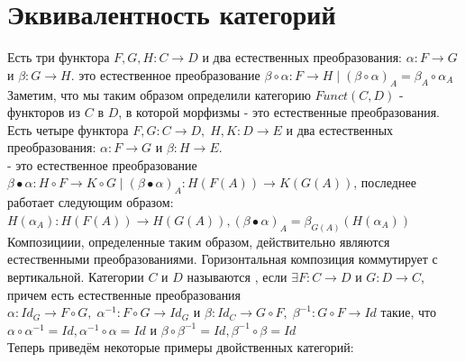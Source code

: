 \documentclass[a4paper]{article}
\theoremstyle{indented}
\theoremstyle{definition}
\theoremstyle{remark}
\DeclareMathOperator{\ra}{\rightarrow}
\begin{document}
\section{Эквивалентность категорий}
 Есть три функтора $F, G, H: C \ra D$ и два естественных преобразования: $\alpha: F \ra G$ и $\beta: G \ra H$.   это естественное преобразование $\beta \circ \alpha : F \ra H\;|\;(\beta \circ \alpha)_A = \beta_A \circ \alpha_A$
\remark Заметим, что мы таким образом определили категорию $Funct(C, D)$ - функторов из $C$ в $D$, в которой морфизмы - это естественные преобразования.
 Есть четыре функтора $F, G: C \ra D, \;H, K: D \ra E$ и два естественных преобразования: $\alpha: F \ra G$ и $\beta: H \ra E$. \\
 - это естественное преобразование $\beta \bullet \alpha: H \circ F \ra K \circ G\;|\;(\beta \bullet \alpha)_A : H(F(A)) \ra K(G(A))$, последнее работает следующим образом: $H(\alpha_A): H(F(A)) \ra H(G(A)), (\beta \bullet \alpha)_A = \beta_{G(A)}(H(\alpha_A))$
\exer Композициии, определенные таким образом, действительно являются естественными преобразованиями.
\exer Горизонтальная композиция коммутирует с вертикальной.
 Категории $C$ и $D$ называются , если $\exists F: C \ra D$ и $G: D \ra C$, причем есть естественные преобразования \\
$\alpha: Id_G \ra F \circ G,\; \alpha^{-1}: F \circ G \ra Id_G$ и $\beta: Id_C \ra G \circ F,\; \beta^{-1}: G \circ F \ra Id$ такие, что \\
$\alpha \circ \alpha^{-1} = Id, \alpha^{-1} \circ \alpha = Id$ и $\beta \circ \beta^{-1} = Id, \beta^{-1} \circ \beta = Id$
\\Теперь приведём некоторые примеры двойственных категорий:
\end{document}
